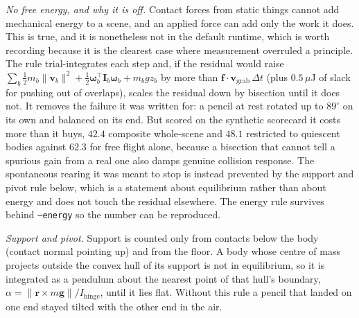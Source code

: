 \documentclass[11pt]{article}
\newcommand{\vv}{\mathbf{v}}
\begin{document}
\emph{No free energy, and why it is off.} Contact forces from static things cannot add mechanical energy to a scene, and an applied force can add only the work it does. This is true, and it is nonetheless not in the default runtime, which is worth recording because it is the clearest case where measurement overruled a principle. The rule trial-integrates each step and, if the residual would raise $\sum_b \tfrac{1}{2}m_b\|\vv_b\|^2 + \tfrac{1}{2}\boldsymbol\omega_b^{\!\top}\mathbf{I}_b\boldsymbol\omega_b + m_b g z_b$ by more than $\mathbf{f}\cdot\vv_{\text{grab}}\,\Delta t$ (plus $0.5\,\mu$J of slack for pushing out of overlaps), scales the residual down by bisection until it does not. It removes the failure it was written for: a pencil at rest rotated up to $89^\circ$ on its own and balanced on its end. But scored on the synthetic scorecard it costs more than it buys, $42.4$ composite whole-scene and $48.1$ restricted to quiescent bodies against $62.3$ for free flight alone, because a bisection that cannot tell a spurious gain from a real one also damps genuine collision response. The spontaneous rearing it was meant to stop is instead prevented by the support and pivot rule below, which is a statement about equilibrium rather than about energy and does not touch the residual elsewhere. The energy rule survives behind \texttt{--energy} so the number can be reproduced.

\emph{Support and pivot.} Support is counted only from contacts below the body (contact normal pointing up) and from the floor. A body whose centre of mass projects outside the convex hull of its support is not in equilibrium, so it is integrated as a pendulum about the nearest point of that hull's boundary, $\alpha = \|\mathbf{r}\times m\mathbf{g}\|/I_{\text{hinge}}$, until it lies flat. Without this rule a pencil that landed on one end stayed tilted with the other end in the air.
\end{document}

